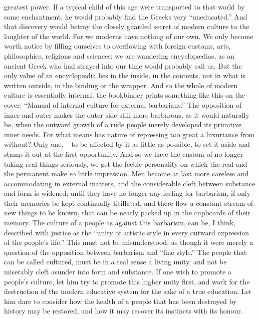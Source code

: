 greatest power. If a typical child of this age were transported to
that world by some enchantment, he would probably find the Greeks
very \enquote{uneducated.} And that discovery would betray the closely
guarded secret of modern culture to the laughter of the world. For we
moderns have nothing of our own. We only become worth notice by
filling ourselves to overflowing with foreign customs, arts,
philosophies, religions and sciences: we are wandering encyclopædias,
as an ancient Greek who had strayed into our time would probably call
us. But the only value of an encyclopædia lies in the inside, in the
contents, not in what is written outside, in the binding or the
wrapper. And so the whole of modern culture is essentially internal;
the bookbinder prints something like this on the cover: \enquote{Manual of
internal culture for external barbarians.} The opposition of inner
and outer makes the outer side still more barbarous, as it would
naturally be, when the outward growth of a rude people merely
developed its primitive inner needs. For what means has nature of
repressing too great a luxuriance from without? Only one, -- to be
affected by it as little as possible, to set it aside and stamp it
out at the first opportunity. And so we have the custom of no longer
taking real things seriously, we get the feeble personality on which
the real and the permanent make so little impression. Men become at
last more careless and accommodating in external matters, and the
considerable cleft between substance and form is widened; until they
have no longer any feeling for barbarism, if only their memories be
kept continually titillated, and there flow a constant stream of new
things to be known, that can be neatly packed up in the cupboards of
their memory. The culture of a people as against this barbarism, can
be, I think, described with justice as the \enquote{unity of artistic style
in every outward expression of the people's life.} This must not be
misunderstood, as though it were merely a question of the opposition
between barbarism and \enquote{fine style.} The people that can be called
cultured, must be in a real sense a living unity, and not be
miserably cleft asunder into form and substance. If one wish to
promote a people's culture, let him try to promote this higher unity
first, and work for the destruction of the modern educative system
for the sake of a true education. Let him dare to consider how the
health of a people that has been destroyed by history may be
restored, and how it may recover its instincts with its honour.

